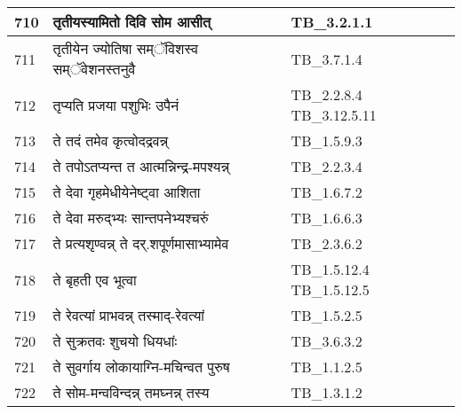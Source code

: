 \documentclass[17pt]{extarticle}
\begin{document}
\begin{longtable}{||p{0.4in}||p{4.9in}||p{0.9in}||}
    710 & तृतीयस्यामितो दिवि सोम आसीत् & TB\_3.2.1.1       \\
    
    \hline
        
    711 & तृतीयेन ज्योतिषा सम्ॅविशस्व सम्ॅवेशनस्तनुवै & TB\_3.7.1.4       \\
    
    \hline
        
    712 & तृप्यति प्रजया पशुभिः उपैनं & TB\_2.2.8.4 TB\_3.12.5.11       \\
    
    \hline
        
    713 & ते तदं तमेव कृत्वोदद्रवन्न् & TB\_1.5.9.3       \\
    
    \hline
        
    714 & ते तपोऽतप्यन्त त आत्मन्निन्द्र{-}मपश्यन्न् & TB\_2.2.3.4       \\
    
    \hline
        
    715 & ते देवा गृहमेधीयेनेष्ट्वा आशिता & TB\_1.6.7.2       \\
    
    \hline
        
    716 & ते देवा मरुद्भ्यः सान्तपनेभ्यश्चरुं & TB\_1.6.6.3       \\
    
    \hline
        
    717 & ते प्रत्यशृण्वन्न् ते दर्.शपूर्णमासाभ्यामेव & TB\_2.3.6.2       \\
    
    \hline
        
    718 & ते बृहती एव भूत्वा & TB\_1.5.12.4 TB\_1.5.12.5       \\
    
    \hline
        
    719 & ते रेवत्यां प्राभवन्न् तस्माद्{-}रेवत्यां & TB\_1.5.2.5       \\
    
    \hline
        
    720 & ते सुक्रतवः शुचयो धियधांः & TB\_3.6.3.2       \\
    
    \hline
        
    721 & ते सुवर्गाय लोकायाग्नि{-}मचिन्वत पुरुष & TB\_1.1.2.5       \\
    
    \hline
        
    722 & ते सोम{-}मन्वविन्दन्न् तमघ्नन्न् तस्य & TB\_1.3.1.2       \\
    

\end{longtable}
\end{document}
